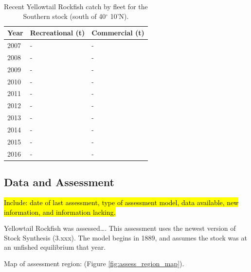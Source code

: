 \documentclass[12pt,]{article}
\begin{document}
\begin{table}[ht]
\centering
\caption{Recent Yellowtail Rockfish catch by 
                                            fleet for the Southern stock 
                                             (south of 40$^\circ$ 10'N).} 
\label{tab:Exec_catch_S}
\begin{tabular}{l>{\centering}p{1.5in}>{\centering}p{1.5in}}
  \hline
Year & Recreational (t) & Commercial (t) \\ 
  \hline
2007 & - & - \\ 
  2008 & - & - \\ 
  2009 & - & - \\ 
  2010 & - & - \\ 
  2011 & - & - \\ 
  2012 & - & - \\ 
  2013 & - & - \\ 
  2014 & - & - \\ 
  2015 & - & - \\ 
  2016 & - & - \\ 
   \hline
\end{tabular}
\end{table}

\FloatBarrier

\newpage

\subsection*{Data and Assessment}\label{data-and-assessment}

\hl{Include: date of last assessment, type of assessment model, data available, new 
information, and information lacking.}

Yellowtail Rockfish was assessed\ldots{}. This assessment uses the
newest version of Stock Synthesis (3.xxx). The model begins in 1889, and
assumes the stock was at an unfished equilibrium that year.

Map of assessment region: (Figure \ref{fig:assess_region_map}).
\end{document}
